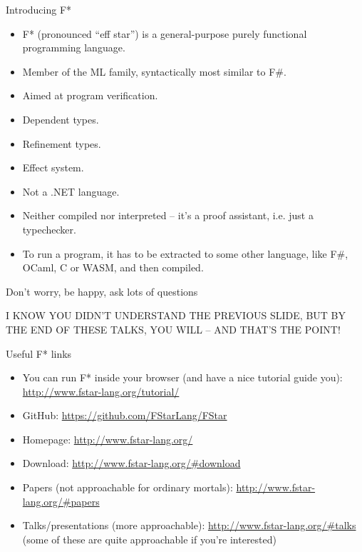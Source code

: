\documentclass{beamer}
\begin{document}
\begin{frame}{Introducing F*}
\begin{itemize}
	\item F* (pronounced ``eff star'') is a general-purpose purely functional programming language.
	\item Member of the ML family, syntactically most similar to F\#.
	\item Aimed at program verification.
	\item Dependent types.
	\item Refinement types.
	\item Effect system.
	\item Not a .NET language.
	\item Neither compiled nor interpreted -- it's a proof assistant, i.e. just a typechecker.
	\item To run a program, it has to be extracted to some other language, like F\#, OCaml, C or WASM, and then compiled.
\end{itemize}
\end{frame}

\begin{frame}{Don't worry, be happy, ask lots of questions}
\begin{center}
	\color{red}
	I KNOW YOU DIDN'T UNDERSTAND THE PREVIOUS SLIDE, BUT BY THE END OF THESE TALKS, YOU WILL -- AND THAT'S THE POINT!
\end{center}
\end{frame}

\begin{frame}{Useful F* links}
\begin{itemize}
	\item You can run F* inside your browser (and have a nice tutorial guide you): \url{http://www.fstar-lang.org/tutorial/}
	\item GitHub: \url{https://github.com/FStarLang/FStar}
	\item Homepage: \url{http://www.fstar-lang.org/}
	\item Download: \url{http://www.fstar-lang.org/\#download}
	\item Papers (not approachable for ordinary mortals): \url{http://www.fstar-lang.org/\#papers}
	\item Talks/presentations (more approachable): \url{http://www.fstar-lang.org/\#talks} (some of these are quite approachable if you're interested)  
\end{itemize}
\end{frame}
\end{document}
